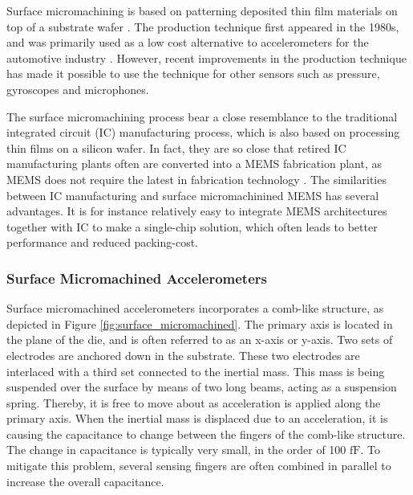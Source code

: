 Surface micromachining is based on patterning deposited thin film materials on top of a substrate wafer \cite[p.~5]{kaajakari09}. The production technique first appeared in the 1980s, and was primarily used as a low cost alternative to accelerometers for the automotive industry \cite[p.~101]{maluf04}. However, recent improvements in the production technique has made it possible to use the technique for other sensors such as pressure, gyroscopes and microphones. 

The surface micromachining process bear a close resemblance to the traditional integrated circuit (IC) manufacturing process, which is also based on processing thin films on a silicon wafer. In fact, they are so close that retired IC manufacturing plants often are converted into a MEMS fabrication plant, as MEMS does not require the latest in fabrication technology \cite[p.~4]{kaajakari09}. The similarities between IC manufacturing and surface micromachinined MEMS has several advantages. It is for instance relatively easy to integrate MEMS architectures together with IC to make a single-chip solution, which often leads to better performance and reduced packing-cost. 

\subsubsection{Surface Micromachined Accelerometers}

Surface micromachined accelerometers incorporates a comb-like structure, as depicted in Figure \ref{fig:surface_micromachined}. The primary axis is located in the plane of the die, and is often referred to as an x-axis or y-axis. Two sets of electrodes are anchored down in the substrate. These two electrodes are interlaced with a third set connected to the inertial mass. This mass is being suspended over the surface by means of two long beams, acting as a suspension spring. Thereby, it is free to move about as acceleration is applied along the primary axis. When the inertial mass is displaced due to an acceleration, it is causing the capacitance to change between the fingers of the comb-like structure. The change in capacitance is typically very small, in the order of 100 $\si{\femto\farad}$. To mitigate this problem, several sensing fingers are often combined in parallel to increase the overall capacitance.

